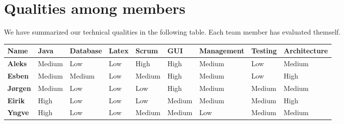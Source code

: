 \section{Qualities among members}

We have summarized our technical qualities in the following table. Each team member has
evaluated themself.
\begin{table}[h]
\begin{center}
\begin{tabular}{|p{1.1cm}|p{1.3cm}|p{1.6cm}|p{0.9cm}|p{1.3cm}|p{1.4cm}|p{2cm}|p{1.4cm}|p{2cm}|}
\hline
\bf{Name} & \bf{Java} & \bf{Database} & \bf{Latex} & \bf{Scrum} & \bf{GUI} &
\bf{Management} & \bf{Testing} & \bf{Architecture} \\
\hline
\bf{Aleks} & Medium & Low & Low & High &	High &	Medium & Low &	Medium \\
\hline \bf{Esben} & Medium & Medium & Low	& Medium & High	& Medium & Low	& High
\\
\hline \bf{Jørgen} & Medium & Low & Low & Low & High &	Medium & Medium & Medium
\\
\hline \bf{Eirik} & High & Low & Low & Low	& Medium	& Medium	& Medium	& High \\
\hline \bf{Yngve} & High & Low &	Low & Medium & Medium & Low & Medium & Medium
\\
\hline

\end{tabular}
\end{center}
\end{table}
